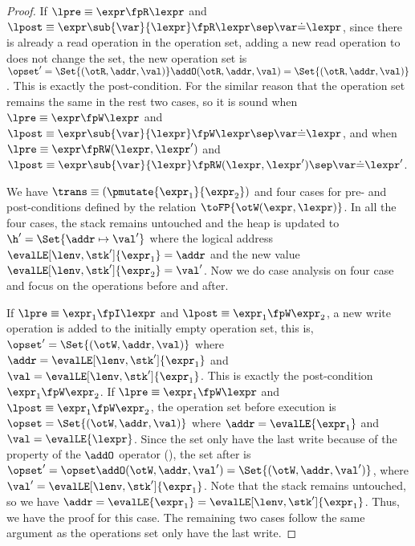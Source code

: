 \begin{proof}
If \( \lpre \equiv \expr \fpR \lexpr \) and \( \lpost \equiv \expr\sub{\var}{\lexpr} \fpR \lexpr \sep \var \dot= \lexpr \), since there is already a read operation in the operation set, adding a new read operation to does not change the set, \ie the new operation set  is \( \opset' = \Set{(\otR, \addr, \val)} \addO (\otR, \addr, \val ) = \Set{(\otR, \addr, \val)} \).
This is exactly the post-condition.
For the similar reason that the operation set remains the same in the rest two cases, so it is sound when \( \lpre \equiv \expr \fpW \lexpr \) and \( \lpost \equiv \expr\sub{\var}{\lexpr} \fpW \lexpr \sep \var \dot= \lexpr \), and when \( \lpre \equiv \expr \fpRW (\lexpr,\lexpr') \) and \( \lpost \equiv \expr\sub{\var}{\lexpr} \fpRW (\lexpr,\lexpr') \sep \var \dot= \lexpr' \).


We have  \( \trans \equiv (\pmutate{\expr_{1}}{\expr_{2}}) \) and four cases for pre- and post-conditions defined by the relation \( \toFP{\otW(\expr, \lexpr)}\). 
In all the four cases, the stack remains untouched and the heap is updated to \( \h' = \Set{\addr \mapsto \val' }\) where the logical address \( \evalLE[\lenv,\stk']{\expr_{1}}  = \addr \) and the new value \( \evalLE[\lenv,\stk']{\expr_{2}} = \val'\).
Now we do case analysis on four case and focus on the operations before and after.

If \( \lpre \equiv \expr_{1} \fpI \lexpr \) and \( \lpost \equiv \expr_{1} \fpW \expr_{2} \), a new write operation is added to the initially empty operation set, this is, \( \opset' = \Set{(\otW, \addr, \val)}\) where \( \addr = \evalLE[\lenv,\stk']{\expr_{1}}\) and \( \val = \evalLE[\lenv,\stk']{\expr_{1}}\).
This is exactly the post-condition \( \expr_{1} \fpW \expr_{2} \).
If \( \lpre \equiv \expr_{1} \fpW \lexpr \) and \( \lpost \equiv \expr_{1} \fpW \expr_{2} \), the operation set before execution is \( \opset = \Set{(\otW, \addr, \val)}\) where \( \addr = \evalLE{\expr_{1}}\) and \( \val = \evalLE{\lexpr}\).
Since the set only have the last write because of the property of the \( \addO \) operator (), the set after is \( \opset' = \opset \addO (\otW, \addr, \val') = \Set{(\otW, \addr, \val')}\), where \( \val' = \evalLE[\lenv,\stk']{\expr_{1}}\).
Note that the stack remains untouched, so we have \( \addr = \evalLE{\expr_{1}} = \evalLE[\lenv,\stk']{\expr_{1}} \).
Thus, we have the proof for this case.
The remaining two cases follow the same argument as the operations set only have the last write.


\end{proof}

